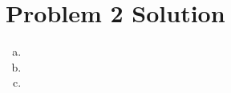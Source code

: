 \documentclass{report}
\begin{document}
\section*{Problem 2 Solution}

\begin{enumerate}[a)]

\item 
\item
\item

\end{enumerate}
\end{document}
